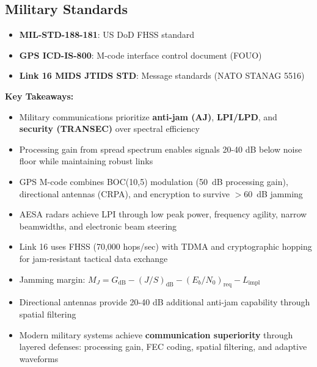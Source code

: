 \subsection{Military Standards}

\begin{itemize}
\item \textbf{MIL-STD-188-181}: US DoD FHSS standard
\item \textbf{GPS ICD-IS-800}: M-code interface control document (FOUO)
\item \textbf{Link 16 MIDS JTIDS STD}: Message standards (NATO STANAG 5516)
\end{itemize}

\textbf{Key Takeaways:}

\begin{itemize}
\item Military communications prioritize \textbf{anti-jam (AJ)}, \textbf{LPI/LPD}, and \textbf{security (TRAN\-SEC)} over spectral efficiency
\item Processing gain from spread spectrum enables signals 20-40 dB below noise floor while maintaining robust links
\item GPS M-code combines BOC(10,5) modulation (50~dB processing gain), directional antennas (CRPA), and encryption to survive $>60$~dB jamming
\item AESA radars achieve LPI through low peak power, frequency agility, narrow beam\-widths, and electronic beam steering
\item Link 16 uses FHSS (70,000 hops/sec) with TDMA and cryptographic hopping for jam-resistant tactical data exchange
\item Jamming margin: $M_J = G_{\text{dB}} - (J/S)_{\text{dB}} - (E_b/N_0)_{\text{req}} - L_{\text{impl}}$
\item Directional antennas provide 20-40 dB additional anti-jam capability through spatial filtering
\item Modern military systems achieve \textbf{communication superiority} through layered defenses: processing gain, FEC coding, spatial filtering, and adaptive waveforms
\end{itemize}
